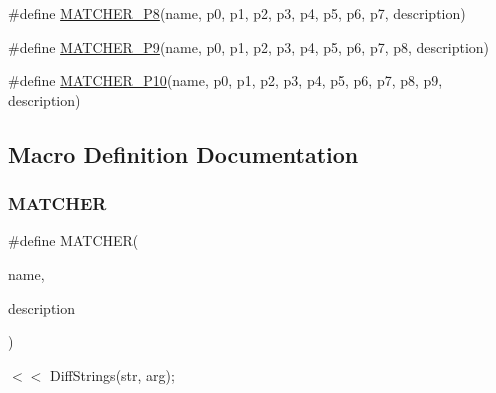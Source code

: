 \begin{DoxyCompactItemize}
\item 
\#define \mbox{\hyperlink{_obj__test_2lib_2googletest-master_2googlemock_2include_2gmock_2gmock-generated-matchers_8h_ad86c95b03df37fada38e18d8eb9e53bc}{M\+A\+T\+C\+H\+E\+R\+\_\+\+P8}}(name,  p0,  p1,  p2,  p3,  p4,  p5,  p6,  p7,  description)
\item 
\#define \mbox{\hyperlink{_obj__test_2lib_2googletest-master_2googlemock_2include_2gmock_2gmock-generated-matchers_8h_a2dc1db146d4112c9fde1c2708807e43e}{M\+A\+T\+C\+H\+E\+R\+\_\+\+P9}}(name,  p0,  p1,  p2,  p3,  p4,  p5,  p6,  p7,  p8,  description)
\item 
\#define \mbox{\hyperlink{_obj__test_2lib_2googletest-master_2googlemock_2include_2gmock_2gmock-generated-matchers_8h_aa6a3925eeb8bcb4b6b3465cc4ff26650}{M\+A\+T\+C\+H\+E\+R\+\_\+\+P10}}(name,  p0,  p1,  p2,  p3,  p4,  p5,  p6,  p7,  p8,  p9,  description)
\end{DoxyCompactItemize}


\subsection{Macro Definition Documentation}
\mbox{\label{_obj__test_2lib_2googletest-master_2googlemock_2include_2gmock_2gmock-generated-matchers_8h_af4fe73ff8e2b0494f4970b575b65ddff}} 
\subsubsection{\texorpdfstring{MATCHER}{MATCHER}}
{\footnotesize\ttfamily \#define M\+A\+T\+C\+H\+ER(\begin{DoxyParamCaption}\item[{}]{name,  }\item[{}]{description }\end{DoxyParamCaption})}



$<$$<$ Diff\+Strings(str, arg); 

\mbox{\label{_obj__test_2lib_2googletest-master_2googlemock_2include_2gmock_2gmock-generated-matchers_8h_acb7ae915efa2fd8d3f6ea7313198afb6}} 
